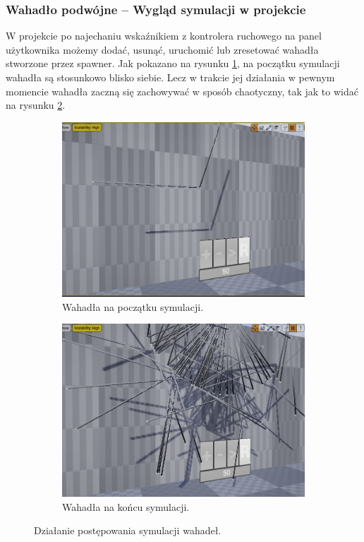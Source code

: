 \documentclass[a4paper,12pt,reqno]{article}
\begin{document}
\subsubsection{Wahadło podwójne – Wygląd symulacji w projekcie}

W projekcie po najechaniu wskaźnikiem z kontrolera ruchowego na panel użytkownika możemy dodać, usunąć, uruchomić lub zresetować wahadła stworzone przez spawner. Jak pokazano na rysunku \ref{Pendulum_in_project:subref_a}, na początku symulacji wahadła są stosunkowo blisko siebie. Lecz w trakcie jej działania w pewnym momencie wahadła zaczną się zachowywać w sposób chaotyczny, tak jak to widać na rysunku \ref{Pendulum_in_project:subref_b}.


\begin{figure}[!ht]%
	\centering
	\begin{subfigure}{.5\textwidth}
		\centering
		\includegraphics[width=.95\linewidth]{graphics/pendulum/PendulumInUE_1.png}
		\caption{Wahadła na początku symulacji.}	
		\label{Pendulum_in_project:subref_a}
	\end{subfigure}%
	\hfill
	\begin{subfigure}{.5\textwidth}
		\centering
		\includegraphics[width=.95\linewidth]{graphics/pendulum/PendulumInUE_2.png}
		\caption{Wahadła na końcu symulacji.}
		\label{Pendulum_in_project:subref_b}
	\end{subfigure}%
	

\caption{Działanie postępowania symulacji wahadeł.}
\label{Pendulum_in_project}
\end{figure}
\end{document}
